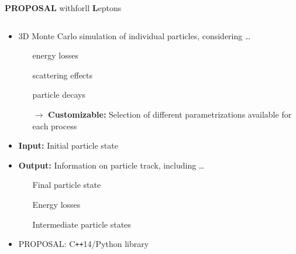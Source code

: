 \begin{frame}{}
  \vspace{-3cm}
  \begin{minipage}[t][1cm][t]{\textwidth}
  {\huge \textbf{PROPOSAL}} {\huge\textbf{\rightarrow}}
  \colorbox{tugreen}{}{\Large with}\colorbox{tugreen}{}{\Large for}\colorbox{tugreen}{ll {\huge \textbf{L}}{\Large eptons}}
  \end{minipage}
  \begin{minipage}[t][1cm][t]{\textwidth}
  \vspace{-5mm}
    \begin{columns}[onlytextwidth]
        \begin{column}{0.5\textwidth}
            \begin{itemize}
              \item 3D Monte Carlo simulation of individual particles, considering \ldots
              \begin{itemize}
                \item[\normalcolor{\ldots}] energy losses
                \item[\normalcolor{\ldots}] scattering effects
                \item[\normalcolor{\ldots}] particle decays
                \item[$\rightarrow$] \textbf{Customizable:} Selection of different parametrizations available for each process
              \end{itemize}
              \item \textbf{Input:} Initial particle state
              \item \textbf{Output:} Information on particle track, including \ldots
              \begin{itemize}
                \item[\normalcolor{\ldots}] Final particle state
                \item[\normalcolor{\ldots}] Energy losses
                \item[\normalcolor{\ldots}] Intermediate particle states
              \end{itemize}
              \item PROPOSAL: C\texttt{++}14/Python library

\end{itemize}
\end{column}
\end{columns}
\end{minipage}
\end{frame}
